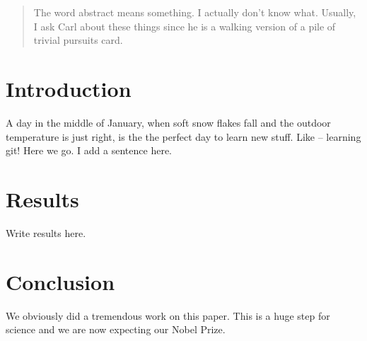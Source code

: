 \documentclass{article}
\begin{document}
\begin{abstract}
The word abstract means something. I actually don't know what.
Usually, I ask Carl about these things since he is a walking version
of a pile of trivial pursuits card.

\end{abstract}

\section{Introduction}

A day in the middle of January, when soft snow flakes fall and the outdoor temperature is just right, is the the perfect day to learn new stuff. 
Like -- learning git! Here we go. I add a sentence here. 

\section{Results}

Write results here.

\section{Conclusion}

We obviously did a tremendous work on this paper. This is a huge step for science and we are now expecting our Nobel Prize.
\end{document}
